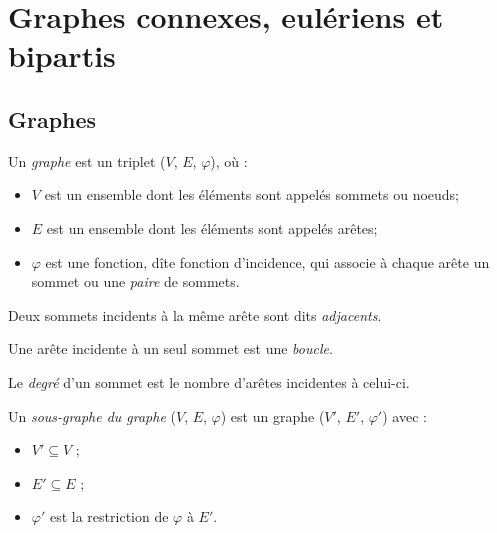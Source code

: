 \section{Graphes connexes, eulériens et bipartis }
\subsection{Graphes}

\begin{mydef}
  \label{def:graph}
  Un \emph{graphe} est un triplet ($V$, $E$, $\varphi$), où :
  \begin{itemize}
    \item $V$ est un ensemble dont les éléments sont appelés sommets ou noeuds;
    \item $E$ est un ensemble dont les éléments sont appelés arêtes;
    \item $\varphi$ est une fonction, dîte fonction d'incidence, qui associe à chaque arête un sommet ou une \emph{paire} de sommets.
  \end{itemize}
\end{mydef}

\begin{mydef}
  Deux sommets incidents à la même arête sont dits \emph{adjacents}.
\end{mydef}

\begin{mydef}
  Une arête incidente à un seul sommet est une \emph{boucle}.
\end{mydef}

\begin{mydef}
  Le \emph{degré} d'un sommet est le nombre d'arêtes incidentes à celui-ci.
\end{mydef}

\begin{mydef}

  Un \emph{sous-graphe du graphe} ($V$, $E$, $\varphi$) est un graphe ($V'$, $E'$, $\varphi'$) avec :
  \begin{itemize}
    \item $V' \subseteq V$ ;
    \item $E' \subseteq E$ ;
    \item $\varphi'$ est la restriction de $\varphi$ à $E'$.
  \end{itemize}

\end{mydef}

